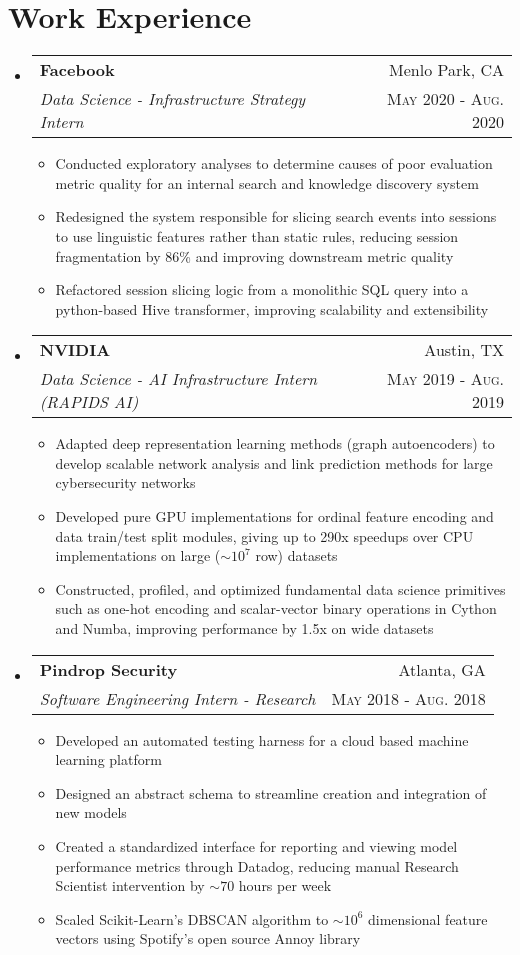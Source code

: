 \documentclass[letterpaper,11pt]{article}
\makeatletter
\newcommand{\resumePlainItem}[1]{
  \item\small{#1 \vspace{-2pt}}
}
\newcommand{\resumeSubheading}[4]{
  \vspace{-1pt}\item[]
    \begin{tabular*}{0.97\textwidth}{l@{\extracolsep{\fill}}r}
      \textbf{#1} & #2 \\
      \textit{\small#3} & \textsc{\small #4} \\ %
    \end{tabular*}\vspace{-5pt}
}
\newcommand{\resumeSubHeadingListStart}{\begin{itemize}[leftmargin=*]}
\newcommand{\resumeSubHeadingListEnd}{\end{itemize}}
\newcommand{\resumeItemListStart}{\begin{itemize}}
\newcommand{\resumeItemListEnd}{\end{itemize}\vspace{-5pt}}
\newenvironment{resumeItemList}{\resumeItemListStart}{\resumeItemListEnd}
\newenvironment{resumeSubheadingList}{\resumeSubHeadingListStart}{\resumeSubHeadingListEnd}
\makeatother
\begin{document}
\section{Work Experience}
  \begin{resumeSubheadingList}
    \resumeSubheading
    {Facebook}{Menlo Park, CA}
    {Data Science - Infrastructure Strategy Intern}{May 2020 - Aug. 2020}
    \begin{resumeItemList}
      \resumePlainItem{Conducted exploratory analyses to determine causes of poor evaluation
      metric quality for an internal search and knowledge discovery system}
      \resumePlainItem{Redesigned the system responsible for slicing search events into sessions
      to use linguistic features rather than static rules, reducing session fragmentation by
      86\% and improving downstream metric quality}
      \resumePlainItem{Refactored session slicing logic from a monolithic
      SQL query into a python-based Hive transformer, improving scalability and extensibility}
    \end{resumeItemList}
    \resumeSubheading
      {NVIDIA}{Austin, TX}
      {Data Science - AI Infrastructure Intern (RAPIDS AI)}{May 2019 - Aug. 2019}
      \begin{resumeItemList}
        \resumePlainItem%
        {Adapted deep representation learning methods (graph autoencoders) to develop scalable
        network analysis and link prediction methods for large cybersecurity networks}
        \resumePlainItem%
        {Developed pure GPU implementations for ordinal feature encoding and data train/test split modules,
        giving up to 290x speedups over CPU implementations on large ($\sim 10^7$ row) datasets}
        \resumePlainItem%
        {Constructed, profiled, and optimized fundamental data science primitives such as one-hot encoding and scalar-vector binary operations
        in Cython and Numba, improving performance by 1.5x on wide datasets}
      \end{resumeItemList}

    \resumeSubheading
    {Pindrop Security}{Atlanta, GA}
    {Software Engineering Intern - Research}{May 2018 - Aug. 2018}
    \begin{resumeItemList}
      \resumePlainItem%
      {Developed an automated testing harness for a cloud based machine learning platform}
      \resumePlainItem%
      {Designed an abstract schema to streamline creation and integration of new models}
      \resumePlainItem%
      {Created a standardized interface for reporting and viewing model performance metrics through
      Datadog, reducing manual Research Scientist intervention by $\sim 70$ hours per week}
      \resumePlainItem%
      {Scaled Scikit-Learn's DBSCAN algorithm to $\sim 10^6$ dimensional feature vectors using 
      Spotify's open source Annoy library}
    \end{resumeItemList}
  \end{resumeSubheadingList}
\end{document}

